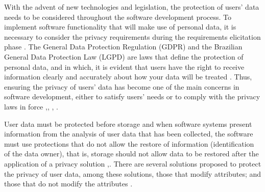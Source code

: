 \documentclass[conference]{IEEEtran}
\begin{document}
With the advent of new technologies and legislation, the protection of users' data needs to be considered throughout the software development process. To implement software functionality that will make use of personal data, it is necessary to consider the privacy requirements during the requirements elicitation phase \cite{DBLP:conf/wer/NettoPS19}. The General Data Protection Regulation (GDPR) \cite{Eu2019} and the Brazilian General Data Protection Law (LGPD) \cite{leiLGPD} are laws that define the protection of personal data, and in which, it is evident that users have the right to receive information clearly and accurately about how your data will be treated \cite{DBLP:conf/re/Ayala-RiveraP18}. Thus, ensuring the privacy of users' data has become one of the main concerns in software development, either to satisfy users' needs or to comply with the privacy laws in force \cite{DBLP:conf/sbes/PeixotoS18},\cite{DBLP:conf/wer/NettoPS19}, \cite{DBLP:conf/amcis/HuthM19}, \cite{DBLP:conf/IEEEares/HorakSH19}.


User data must be protected before storage and when software systems present information from the analysis of user data that has been collected, the software must use protections that do not allow the restore of information (identification of the data owner), that is, storage should not allow data to be restored after the application of a privacy solution \cite{Eu2019},\cite{leiLGPD}. There are several solutions proposed to protect the privacy of user data, among these solutions, those that modify attributes; and those that do not modify the attributes \cite{DBLP:journals/iotj/Vergara-Laurens17}.

\end{document}
